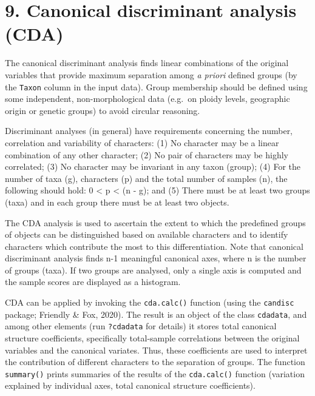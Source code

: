 \documentclass[
  11pt,
  a4paper]{article}
\begin{document}
\newpage

\hypertarget{canonical-discriminant-analysis-cda}{%
\section{9. Canonical discriminant analysis
(CDA)}\label{canonical-discriminant-analysis-cda}}

The canonical discriminant analysis finds linear combinations of the
original variables that provide maximum separation among \emph{a priori}
defined groups (by the \texttt{Taxon} column in the input data). Group
membership should be defined using some independent, non-morphological
data (e.g.~on ploidy levels, geographic origin or genetic groups) to
avoid circular reasoning.

Discriminant analyses (in general) have requirements concerning the
number, correlation and variability of characters: (1) No character may
be a linear combination of any other character; (2) No pair of
characters may be highly correlated; (3) No character may be invariant
in any taxon (group); (4) For the number of taxa (g), characters (p) and
the total number of samples (n), the following should hold: 0
\textless{} p \textless{} (n - g); and (5) There must be at least two
groups (taxa) and in each group there must be at least two objects.

The CDA analysis is used to ascertain the extent to which the predefined
groups of objects can be distinguished based on available characters and
to identify characters which contribute the most to this
differentiation. Note that canonical discriminant analysis finds n-1
meaningful canonical axes, where n is the number of groups (taxa). If
two groups are analysed, only a single axis is computed and the sample
scores are displayed as a histogram.

CDA can be applied by invoking the \texttt{cda.calc()} function (using
the \texttt{candisc} package; Friendly \& Fox, 2020). The result is an
object of the class \texttt{cdadata}, and among other elements (run
\texttt{?cdadata} for details) it stores total canonical structure
coefficients, specifically total-sample correlations between the
original variables and the canonical variates. Thus, these coefficients
are used to interpret the contribution of different characters to the
separation of groups. The function \texttt{summary()} prints summaries
of the results of the \texttt{cda.calc()} function (variation explained
by individual axes, total canonical structure coefficients).
\end{document}
